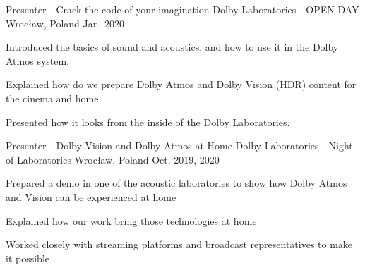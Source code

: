 

\begin{cventries}

  \cventry
    {Presenter - Crack the code of your imagination} %
    {Dolby Laboratories - OPEN DAY} %
    {Wrocław, Poland} %
    {Jan. 2020} %
    {
      \begin{cvitems} %
        \item {Introduced the basics of sound and acoustics, and how to use it in the Dolby Atmos system.}
        \item {Explained how do we prepare Dolby Atmos and Dolby Vision (HDR) content for the cinema and home.}
        \item {Presented how it looks from the inside of the Dolby Laboratories.}
      \end{cvitems}
    }

  \cventry
    {Presenter - Dolby Vision and Dolby Atmos at Home} %
    {Dolby Laboratories - Night of Laboratories} %
    {Wrocław, Poland} %
    {Oct. 2019, 2020} %
    {
      \begin{cvitems} %
        \item {Prepared a demo in one of the acoustic laboratories to show how Dolby Atmos and Vision can be experienced at home}
        \item {Explained how our work bring those technologies at home}
        \item {Worked closely with streaming platforms and broadcast representatives to make it possible}
      \end{cvitems}
    }

\end{cventries}
